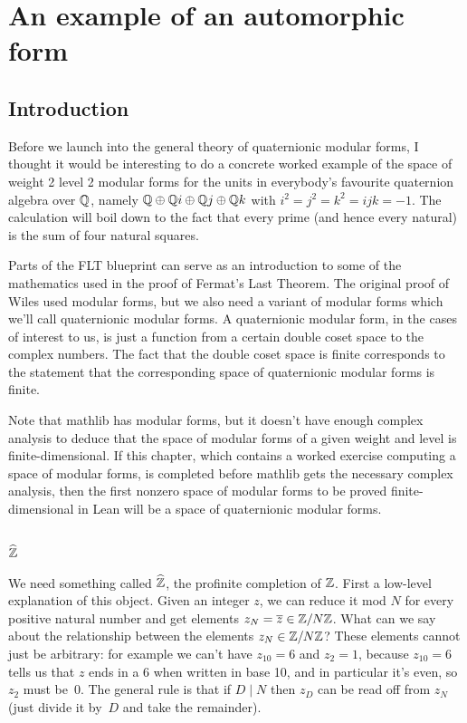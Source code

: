 \chapter{An example of an automorphic form}

\section{Introduction}

Before we launch into the general theory of quaternionic modular forms, I thought it
would be interesting to do a concrete worked example of the space of weight 2 level 2
modular forms for the units in everybody's favourite quaternion algebra over $\mathbb{Q}$, namely
$\mathbb{Q}\oplus\mathbb{Q} i\oplus\mathbb{Q} j\oplus\mathbb{Q} k$ with $i^2=j^2=k^2=ijk=-1$. The calculation will
boil down to the fact that every prime (and hence every natural) is the sum of four
natural squares.

Parts of the FLT blueprint can serve as an introduction to some of the mathematics used in the proof of
Fermat's Last Theorem. The original proof of Wiles used modular forms, but we also need a
variant of modular forms which we'll call quaternionic modular forms. A quaternionic modular
form, in the cases of interest to us, is just a function from a certain double coset space
to the complex numbers. The fact that the double coset space is finite corresponds to the statement
that the corresponding space of quaternionic modular forms is finite.

Note that mathlib has modular forms, but it doesn't have enough complex analysis to deduce
that the space of modular forms of a given weight and level is finite-dimensional. If this
chapter, which contains a worked exercise computing a space of modular forms, is completed
before mathlib gets the necessary complex analysis, then the first nonzero space of modular forms
to be proved finite-dimensional in Lean will be a space of quaternionic modular forms.


\section{$\widehat{\mathbb{Z}}$}

We need something called $\widehat{\mathbb{Z}}$, the profinite completion of $\mathbb{Z}$. First a low-level explanation
of this object. Given an integer $z$, we can reduce it mod $N$ for every positive natural
number and get elements $z_N=\overline{z}\in\mathbb{Z}/N\mathbb{Z}$. What can we say 
about the relationship between the elements $z_N\in\mathbb{Z}/N\mathbb{Z}$? These elements cannot just be
arbitrary: for example we can't have $z_{10}=6$ and $z_2=1$, because $z_{10}=6$ tells us that
$z$ ends in a 6 when written in base 10, and in particular it's even, so $z_2$ must be~0.
The general rule is that if $D\mid N$ then $z_D$ can be read off from $z_N$ (just divide it by~$D$
and take the remainder).


